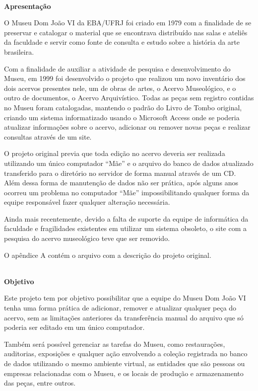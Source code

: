 \documentclass[a4paper,12pt,oneside,onecolumn,final,fleqn]{repUERJ}
\begin{document}
$\!$\\
\textbf{Apresentação}

\vspace{10pt}

O Museu Dom João VI da EBA/UFRJ foi criado em 1979 com a finalidade de se preservar e catalogar o material que se encontrava distribuído nas salas e ateliês da faculdade e servir como fonte de consulta e estudo sobre a história da arte brasileira. 

Com a finalidade de auxiliar a atividade de pesquisa e desenvolvimento do Museu, em 1999 foi desenvolvido o projeto que realizou um novo inventário dos dois acervos presentes nele, um de obras de artes, o Acervo Museológico, e o outro de documentos, o Acervo Arquivístico. Todas as peças sem registro contidas no Museu foram catalogadas, mantendo o padrão do Livro de Tombo original, criando um sistema informatizado usando o Microsoft Access onde se poderia atualizar informações sobre o acervo, adicionar ou remover novas peças e realizar consultas através de um site.

O projeto original previa que toda edição no acervo deveria ser realizada utilizando um único computador ``Mãe'' e o arquivo do banco de dados atualizado transferido para o diretório no servidor de forma manual através de um CD. Além dessa forma de manutenção de dados não ser prática, após alguns anos ocorreu um problema no computador ``Mãe'' impossibilitando qualquer forma da equipe responsável fazer qualquer alteração necessária. 

Ainda mais recentemente, devido a falta de suporte da equipe de informática da faculdade e fragilidades existentes em utilizar um sistema obsoleto, o site com a pesquisa do acervo museológico teve que ser removido.

O apêndice A contém o arquivo com a descrição do projeto original.

\vspace{10pt}
$\!$\\
\textbf{Objetivo}
\vspace{10pt}

Este projeto tem por objetivo possibilitar que a equipe do Museu Dom João VI tenha uma forma prática de adicionar, remover e atualizar qualquer peça do acervo, sem as limitações anteriores da transferência manual do arquivo que só poderia ser editado em um único computador.

Também será possível gerenciar as tarefas do Museu, como restaurações, auditorias, exposições e qualquer ação envolvendo a coleção registrada no banco de dados utilizando o mesmo ambiente virtual, as entidades que são pessoas ou empresas relacionadas com o Museu, e os locais de produção e armazenamento das peças, entre outros.
\end{document}

